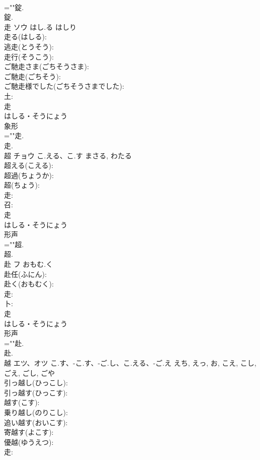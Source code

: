 \documentclass[8pt]{extreport}
\begin{document}
\begin{CJK}{UTF8}{min}
\\	=""錠.
\\	錠.
\\	走	ソウ	はし.る	はしり	
\\	走る(はしる): 
\\	逃走(とうそう): 
\\	走行(そうこう): 
\\	ご馳走さま(ごちそうさま): 
\\	ご馳走(ごちそう): 
\\	ご馳走様でした(ごちそうさまでした): 
\\	土: 
\\	走	
\\	はしる・そうにょう	
\\	象形 
\\	=""走.
\\	走.
\\	超	チョウ	こ.える、こ.す	まさる, わたる	
\\	超える(こえる): 
\\	超過(ちょうか): 
\\	超(ちょう): 
\\	走: 
\\	召: 
\\	走	
\\	はしる・そうにょう	
\\	形声 
\\	=""超.
\\	超.
\\	赴	フ	おもむ.く		
\\	赴任(ふにん): 
\\	赴く(おもむく): 
\\	走: 
\\	卜: 
\\	走	
\\	はしる・そうにょう	
\\	形声 
\\	=""赴.
\\	赴.
\\	越	エツ、オツ	こ.す、-こ.す、-ご.し、こ.える、-ご.え	えち, えっ, お, こえ, こし, ごえ, ごし, ごや	
\\	引っ越し(ひっこし): 
\\	引っ越す(ひっこす): 
\\	越す(こす): 
\\	乗り越し(のりこし): 
\\	追い越す(おいこす): 
\\	寄越す(よこす): 
\\	優越(ゆうえつ): 
\\	走: 

\end{CJK}
\end{document}
